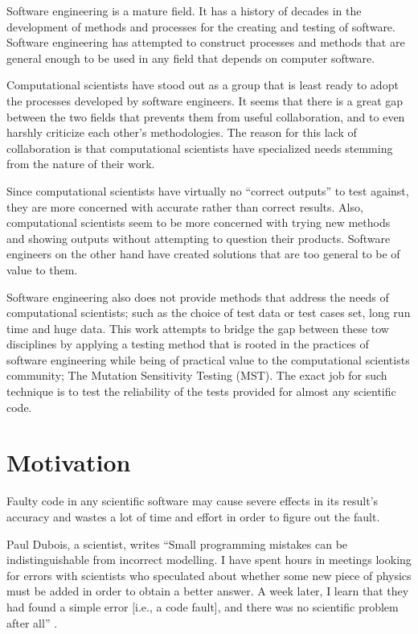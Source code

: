 \documentclass{acm_proc_article-sp}
\begin{document}
Software engineering is a mature field. It has a history of decades in the development of methods and processes for the creating and testing of software. Software engineering has attempted to construct processes and methods that are general enough to be used in any field that depends on computer software.

Computational scientists have stood out as a group that is least ready to adopt the processes developed by software engineers. It seems that there is a great gap between the two fields that prevents them from useful collaboration, and to even harshly criticize each other's methodologies. The reason for this lack of collaboration is that computational scientists have specialized needs stemming from the nature of their work. 

Since computational scientists have virtually no ``correct outputs'' to test against, they are more concerned with accurate rather than correct results. Also, computational scientists seem to be more concerned with trying new methods and showing outputs without attempting to question their products. Software engineers on the other hand have created solutions that are too general to be of value to them.\cite{a3}

Software engineering also does not provide methods that address the needs of computational scientists; such as the choice of test data or test cases set, long run time and huge data. This work attempts to bridge the gap between these tow disciplines by applying a testing method that is rooted in the practices of software engineering while being of practical value to the computational scientists community; The Mutation Sensitivity Testing (MST). The exact job for such technique is to test the reliability of the tests provided for almost any scientific code.\cite{a2}

\section{Motivation}
Faulty code in any scientific software may cause severe effects in its result's accuracy and wastes a lot of time and effort in order to figure out the fault.

Paul Dubois, a scientist, writes ``Small programming mistakes can be indistinguishable from incorrect modelling. I have spent hours in meetings looking for errors with scientists who speculated about whether some new piece of physics must be added in order to obtain a better answer. A week later, I learn that they had found a simple error [i.e., a code fault], and there was no scientific problem after all'' \cite{a4}.
\end{document}
